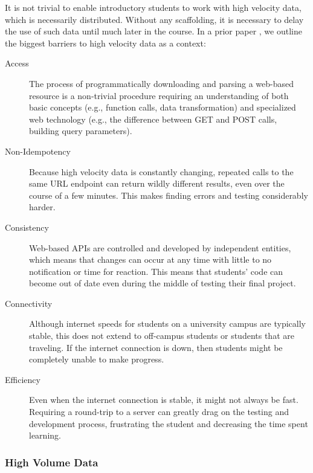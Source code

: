 It is not trivial to enable introductory students to work with high velocity data, which is necessarily distributed. Without any scaffolding, it is necessary to delay the use of such data until much later in the course. In a prior paper \cite{realtimeweb-splashe}, we outline the biggest barriers to high velocity data as a context:
\begin{description}
  \item[Access] The process of programmatically downloading and parsing a web-based resource is a non-trivial procedure requiring an understanding of both basic concepts (e.g., function calls, data transformation) and specialized web technology (e.g., the difference between GET and POST calls, building query parameters).
	\item[Non-Idempotency] Because high velocity data is constantly changing, repeated calls to the same URL endpoint can return wildly different results, even over the course of a few minutes. This makes finding errors and testing considerably harder.
	\item[Consistency] Web-based APIs are controlled and developed by independent entities, which means that changes can occur at any time with little to no notification or time for reaction. This means that students' code can become out of date even during the middle of testing their final project.
	\item[Connectivity] Although internet speeds for students on a university campus are typically stable, this does not extend to off-campus students or students that are traveling. If the internet connection is down, then students might be completely unable to make progress.
	\item[Efficiency] Even when the internet connection is stable, it might not always be fast. Requiring a round-trip to a server can greatly drag on the testing and development process, frustrating the student and decreasing the time spent learning.
\end{description}

\subsubsection{High Volume Data}

